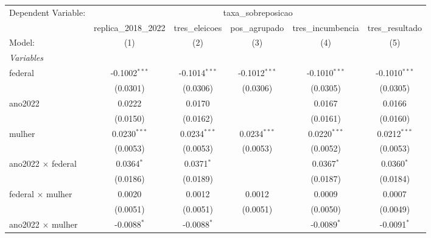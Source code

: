 
\begingroup
\centering
\begin{tabular}{lccccc}
   \tabularnewline \midrule \midrule
   Dependent Variable: & \multicolumn{5}{c}{taxa\_sobreposicao}\\
                                              & replica\_2018\_2022   & tres\_eleicoes  & pos\_agrupado   & tres\_incumbencia  & tres\_resultado \\    
   Model:                                     & (1)                   & (2)             & (3)             & (4)                & (5)\\  
   \midrule
   \emph{Variables}\\
   federal                                    & -0.1002$^{***}$       & -0.1014$^{***}$ & -0.1012$^{***}$ & -0.1010$^{***}$    & -0.1010$^{***}$\\   
                                              & (0.0301)              & (0.0306)        & (0.0306)        & (0.0305)           & (0.0305)\\   
   ano2022                                    & 0.0222                & 0.0170          &                 & 0.0167             & 0.0166\\   
                                              & (0.0150)              & (0.0162)        &                 & (0.0161)           & (0.0160)\\   
   mulher                                     & 0.0230$^{***}$        & 0.0234$^{***}$  & 0.0234$^{***}$  & 0.0220$^{***}$     & 0.0212$^{***}$\\   
                                              & (0.0053)              & (0.0053)        & (0.0053)        & (0.0052)           & (0.0053)\\   
   ano2022 $\times$ federal                   & 0.0364$^{*}$          & 0.0371$^{*}$    &                 & 0.0367$^{*}$       & 0.0360$^{*}$\\   
                                              & (0.0186)              & (0.0189)        &                 & (0.0187)           & (0.0184)\\   
   federal $\times$ mulher                    & 0.0020                & 0.0012          & 0.0012          & 0.0009             & 0.0007\\   
                                              & (0.0051)              & (0.0051)        & (0.0051)        & (0.0050)           & (0.0049)\\   
   ano2022 $\times$ mulher                    & -0.0088$^{*}$         & -0.0088$^{*}$   &                 & -0.0089$^{*}$      & -0.0091$^{*}$\\   

\end{tabular}
